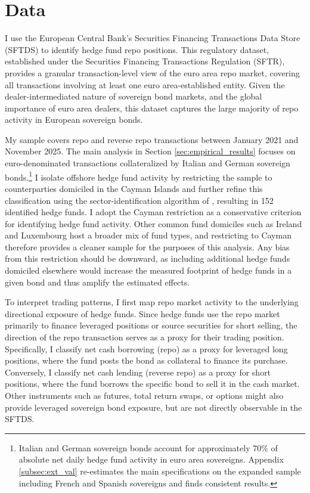 \documentclass[english, 11pt, oneside]{article}
\begin{document}
\section{Data}
\label{sec:data}

I use the European Central Bank’s Securities Financing Transactions Data Store (SFTDS) to identify hedge fund repo positions. This regulatory dataset, established under the Securities Financing Transactions Regulation (SFTR), provides a granular transaction-level view of the euro area repo market, covering all transactions involving at least one euro area-established entity. Given the dealer-intermediated nature of sovereign bond markets, and the global importance of euro area dealers, this dataset captures the large majority of repo activity in European sovereign bonds.

My sample covers repo and reverse repo transactions between January 2021 and November 2025. The main analysis in Section \ref{sec:empirical_results} focuses on euro-denominated transactions collateralized by Italian and German sovereign bonds.\footnote{Italian and German sovereign bonds account for approximately 70\% of absolute net daily hedge fund activity in euro area sovereigns. Appendix \ref{subsec:ext_val} re-estimates the main specifications on the expanded sample including French and Spanish sovereigns and finds consistent results.} I isolate offshore hedge fund activity by restricting the sample to counterparties domiciled in the Cayman Islands \citep[see][for a discussion on the relevance of Cayman Island domiciled hedge funds]{barth2025cross} and further refine this classification using the sector-identification algorithm of \citet{lenoci2021}, resulting in 152 identified hedge funds. I adopt the Cayman restriction as a conservative criterion for identifying hedge fund activity. Other common fund domiciles such as Ireland and Luxembourg host a broader mix of fund types, and restricting to Cayman therefore provides a cleaner sample for the purposes of this analysis. Any bias from this restriction should be downward, as including additional hedge funds domiciled elsewhere would increase the measured footprint of hedge funds in a given bond and thus amplify the estimated effects.

To interpret trading patterns, I first map repo market activity to the underlying directional exposure of hedge funds. Since hedge funds use the repo market primarily to finance leveraged positions or source securities for short selling, the direction of the repo transaction serves as a proxy for their trading position. Specifically, I classify net cash borrowing (repo) as a proxy for leveraged long positions, where the fund posts the bond as collateral to finance its purchase. Conversely, I classify net cash lending (reverse repo) as a proxy for short positions, where the fund borrows the specific bond to sell it in the cash market. Other instruments such as futures, total return swaps, or options might also provide leveraged sovereign bond exposure, but are not directly observable in the SFTDS.
\end{document}
